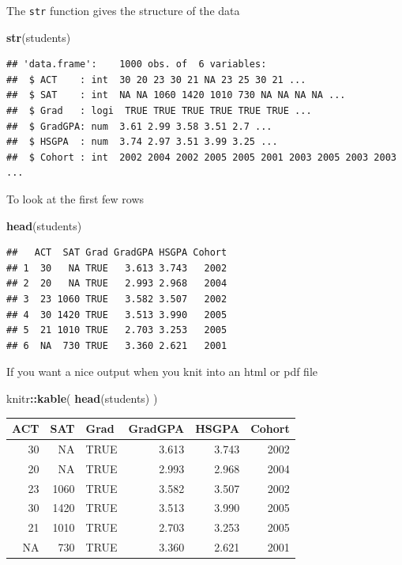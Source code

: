 \documentclass[]{book}
\newenvironment{Shaded}{\begin{snugshade}}{\end{snugshade}}
\newcommand{\KeywordTok}[1]{\textcolor[rgb]{0.13,0.29,0.53}{\textbf{#1}}}
\newcommand{\OperatorTok}[1]{\textcolor[rgb]{0.81,0.36,0.00}{\textbf{#1}}}
\newcommand{\NormalTok}[1]{#1}
\theoremstyle{definition}
\theoremstyle{definition}
\theoremstyle{definition}
\theoremstyle{remark}
\begin{document}
The \texttt{str} function gives the structure of the data

\begin{Shaded}
\begin{Highlighting}[]
\KeywordTok{str}\NormalTok{(students)}
\end{Highlighting}
\end{Shaded}

\begin{verbatim}
## 'data.frame':    1000 obs. of  6 variables:
##  $ ACT    : int  30 20 23 30 21 NA 23 25 30 21 ...
##  $ SAT    : int  NA NA 1060 1420 1010 730 NA NA NA NA ...
##  $ Grad   : logi  TRUE TRUE TRUE TRUE TRUE TRUE ...
##  $ GradGPA: num  3.61 2.99 3.58 3.51 2.7 ...
##  $ HSGPA  : num  3.74 2.97 3.51 3.99 3.25 ...
##  $ Cohort : int  2002 2004 2002 2005 2005 2001 2003 2005 2003 2003 ...
\end{verbatim}

To look at the first few rows

\begin{Shaded}
\begin{Highlighting}[]
\KeywordTok{head}\NormalTok{(students)}
\end{Highlighting}
\end{Shaded}

\begin{verbatim}
##   ACT  SAT Grad GradGPA HSGPA Cohort
## 1  30   NA TRUE   3.613 3.743   2002
## 2  20   NA TRUE   2.993 2.968   2004
## 3  23 1060 TRUE   3.582 3.507   2002
## 4  30 1420 TRUE   3.513 3.990   2005
## 5  21 1010 TRUE   2.703 3.253   2005
## 6  NA  730 TRUE   3.360 2.621   2001
\end{verbatim}

If you want a nice output when you knit into an html or pdf file

\begin{Shaded}
\begin{Highlighting}[]
\NormalTok{knitr}\OperatorTok{::}\KeywordTok{kable}\NormalTok{(}
\KeywordTok{head}\NormalTok{(students)}
\NormalTok{)}
\end{Highlighting}
\end{Shaded}

\begin{tabular}{r|r|l|r|r|r}
\hline
ACT & SAT & Grad & GradGPA & HSGPA & Cohort\\
\hline
30 & NA & TRUE & 3.613 & 3.743 & 2002\\
\hline
20 & NA & TRUE & 2.993 & 2.968 & 2004\\
\hline
23 & 1060 & TRUE & 3.582 & 3.507 & 2002\\
\hline
30 & 1420 & TRUE & 3.513 & 3.990 & 2005\\
\hline
21 & 1010 & TRUE & 2.703 & 3.253 & 2005\\
\hline
NA & 730 & TRUE & 3.360 & 2.621 & 2001\\
\hline
\end{tabular}
\end{document}
